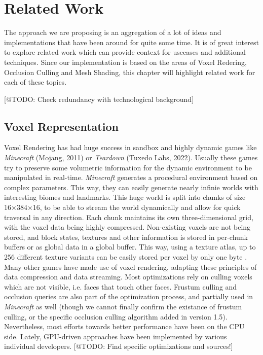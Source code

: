 \chapter{Related Work} \label{cpt-related-work}

The approach we are proposing is an aggregation of a lot of ideas and implementations that have been 
around for quite some time. It is of great interest to explore related work which can provide 
context for usecases and additional techniques. Since our implementation is based on the areas 
of Voxel Redering, Occlusion Culling and Mesh Shading, this chapter will highlight related work 
for each of these topics. 


[@TODO: Check redundancy with technological background]

\section{Voxel Representation}

Voxel Rendering has had huge success in sandbox and highly dynamic games like \emph{Minecraft} (Mojang, 2011) 
or \emph{Teardown} (Tuxedo Labs, 2022). Usually these games try to preserve some volumetric information for the 
dynamic environment to be manipulated in real-time. \emph{Minecraft} generates a procedural environment based on 
complex parameters. This way, they can easily generate nearly infinie worlds with interesting biomes and 
landmarks. This huge world is split into chunks of size 16×384×16, to be able to stream the world dynamically and 
allow for quick traversal in any direction. Each chunk maintains its own three-dimensional grid, with the voxel 
data being highly compressed. Non-existing voxels are not being stored, and block states, textures and other 
information is stored in per-chunk buffers or as global data in a global buffer. This way, using a texture atlas, 
up to 256 different texture variants can be easily stored per voxel by only one byte 
\cite{Bergensten2012, MinecraftFandom2021}. \\

\noindent
Many other games have made use of voxel rendering, adapting these principles of data compression and data streaming. 
Most optimizations rely on culling voxels which are not visible, i.e. faces that touch other faces.
Frustum culling and occlusion queries are also part of the optimization process, and partially used in \emph{Minecraft} 
as well (though we cannot finally confirm the existance of frustum culling, or the specific occlusion culling 
algorithm added in version 1.5). Nevertheless, most efforts towards better performance have been on the \ac{CPU} side.
Lately, \ac{GPU}-driven approaches have been implemented by various individual developers. [@TODO: Find specific 
optimizations and sources!]  \\


